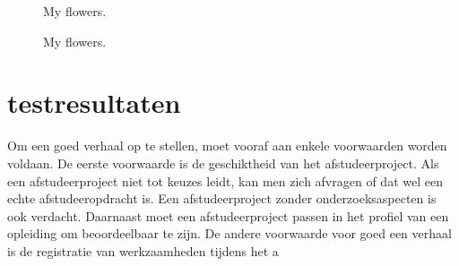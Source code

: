 		
		\begin{figure}[!tbp]
			\centering
			\hfill
			\caption{My flowers.}
			\hfill
			\caption{My flowers.}
		\end{figure}
		
		
		
		\section{testresultaten}
		Om een goed verhaal op te stellen, moet vooraf aan enkele voorwaarden
		worden voldaan. De eerste voorwaarde is de geschiktheid van het
		afstudeerproject. Als een afstudeerproject niet tot keuzes leidt, kan
		men zich afvragen of dat wel een echte afstudeeropdracht is. Een
		afstudeerproject zonder onderzoeksaspecten is ook verdacht. Daarnaast
		moet een afstudeerproject passen in het profiel van een opleiding om
		beoordeelbaar te zijn. De andere voorwaarde voor goed een verhaal is
		de registratie van werkzaamheden tijdens het a
		
